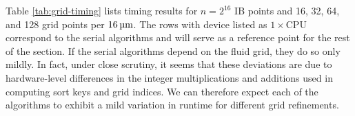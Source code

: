 Table \ref{tab:grid-timing} lists timing results for $n=2^{16}$ IB points and 16, 32, 64,
and 128 grid points per $16\um$. The rows with device listed as $1\times\text{CPU}$
correspond to the serial algorithms and will serve as a reference point for the rest of
the section. If the serial algorithms depend on the fluid grid, they do so only mildly.
In fact, under close scrutiny, it seems that these deviations are due to hardware-level
differences in the integer multiplications and additions used in computing sort keys and
grid indices. We can therefore expect each of the algorithms to exhibit a mild variation
in runtime for different grid refinements.


